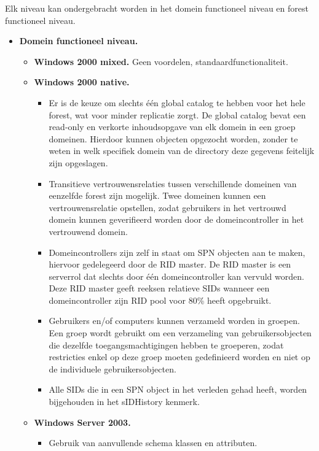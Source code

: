 \begin{enumerate}
{		}
		 {
			Elk niveau kan ondergebracht worden in het domein functioneel niveau en forest functioneel niveau.
			\begin{itemize}
				\item \textbf{Domein functioneel niveau.}
				\begin{itemize}
					\item \textbf{Windows 2000 mixed.} Geen voordelen, standaardfunctionaliteit.
					\item \textbf{Windows 2000 native.}
					\begin{itemize}
						\item Er is de keuze om slechts één global catalog te hebben voor het hele forest, wat voor minder replicatie zorgt. De global catalog bevat een read-only en verkorte inhoudsopgave van elk domein in een groep domeinen. Hierdoor kunnen objecten opgezocht worden, zonder te weten in welk specifiek domein van de directory deze gegevens feitelijk zijn opgeslagen.
						\item Transitieve vertrouwensrelaties tussen verschillende domeinen van eenzelfde forest zijn mogelijk. Twee domeinen kunnen een vertrouwensrelatie opstellen, zodat gebruikers in het vertrouwd domein kunnen geverifieerd worden door de domeincontroller in het vertrouwend domein. 
						\item Domeincontrollers zijn zelf in staat om SPN objecten aan te maken, hiervoor gedelegeerd door de RID master. De RID master is een serverrol dat slechts door één domeincontroller kan vervuld worden. Deze RID master geeft reeksen relatieve SIDs wanneer een domeincontroller zijn RID pool voor 80\% heeft opgebruikt.
						\item Gebruikers en/of computers kunnen verzameld worden in groepen. Een groep wordt gebruikt om een verzameling van gebruikersobjecten die dezelfde toegangsmachtigingen hebben te groeperen, zodat restricties enkel op deze groep moeten gedefinieerd worden en niet op de individuele gebruikersobjecten.
						\item Alle SIDs die in een SPN object in het verleden gehad heeft, worden bijgehouden in het sIDHistory kenmerk.
					\end{itemize}
					\item \textbf{Windows Server 2003.}
					\begin{itemize}
						\item Gebruik van aanvullende schema klassen en attributen.

\end{itemize}
\end{itemize}
\end{itemize}}
\end{enumerate}

